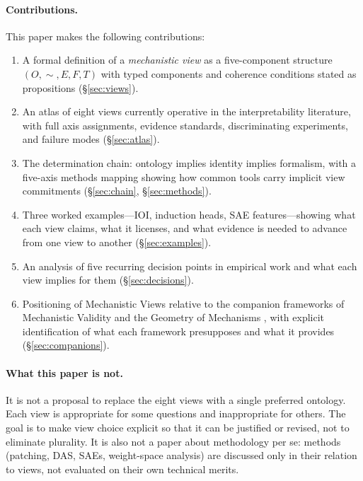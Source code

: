 \documentclass[11pt]{article}
\theoremstyle{remark}
\begin{document}
\paragraph{Contributions.}
This paper makes the following contributions:
\begin{enumerate}[leftmargin=*]
\item A formal definition of a \emph{mechanistic view} as a five-component
      structure $(O, {\sim}, E, F, T)$ with typed components and coherence
      conditions stated as propositions (\S\ref{sec:views}).
\item An atlas of eight views currently operative in the
      interpretability literature, with full axis assignments, evidence
      standards, discriminating experiments, and failure modes
      (\S\ref{sec:atlas}).
\item The determination chain: ontology implies identity implies formalism,
      with a five-axis methods mapping showing how common tools carry
      implicit view commitments (\S\ref{sec:chain}, \S\ref{sec:methods}).
\item Three worked examples---IOI, induction heads, SAE features---showing
      what each view claims, what it licenses, and what evidence is needed
      to advance from one view to another (\S\ref{sec:examples}).
\item An analysis of five recurring decision points in empirical work and
      what each view implies for them (\S\ref{sec:decisions}).
\item Positioning of Mechanistic Views relative to the companion
      frameworks of Mechanistic Validity \citep{tower2026mechval} and the
      Geometry of Mechanisms \citep{tower2026geom}, with explicit
      identification of what each framework presupposes and what it provides
      (\S\ref{sec:companions}).
\end{enumerate}

\paragraph{What this paper is not.}
It is not a proposal to replace the eight views with a single preferred
ontology.  Each view is appropriate for some questions and inappropriate
for others.  The goal is to make view choice explicit so that it can be
justified or revised, not to eliminate plurality.  It is also not a
paper about methodology per se: methods (patching, DAS, SAEs,
weight-space analysis) are discussed only in their relation to views,
not evaluated on their own technical merits.
\end{document}
